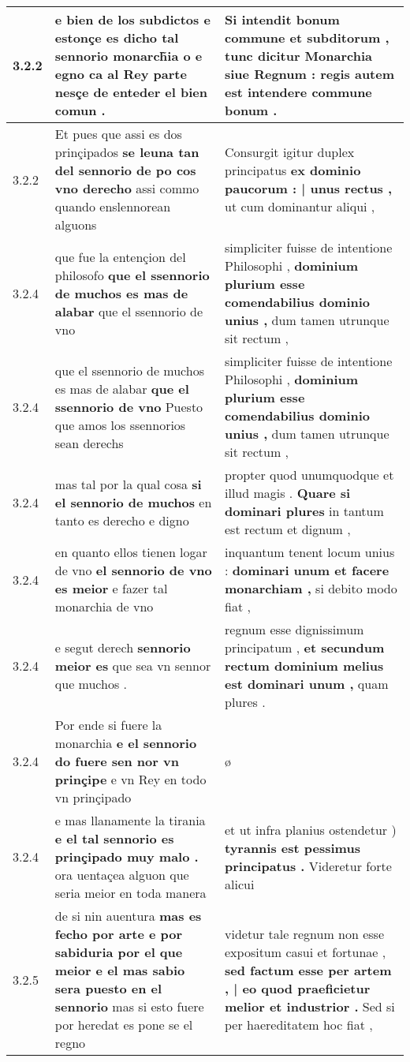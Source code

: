 \begin{tabular}{|p{1cm}|p{6.5cm}|p{6.5cm}|}
3.2.2 & e bien de los subdictos \textbf{ e estonçe es dicho tal sennorio monarch̃ia o e egno } ca al Rey parte nesçe de enteder el bien comun . & Si intendit bonum commune et subditorum , \textbf{ tunc dicitur Monarchia siue Regnum : } regis autem est intendere commune bonum . \\\hline
3.2.2 & Et pues que assi es dos prinçipados \textbf{ se leuna tan del sennorio de po cos vno derecho } assi commo quando enslennorean alguons & Consurgit igitur duplex principatus \textbf{ ex dominio paucorum : | unus rectus , } ut cum dominantur aliqui , \\\hline
3.2.4 & que fue la entençion del philosofo \textbf{ que el ssennorio de muchos es mas de alabar } que el ssennorio de vno & simpliciter fuisse de intentione Philosophi , \textbf{ dominium plurium esse comendabilius dominio unius , } dum tamen utrunque sit rectum , \\\hline
3.2.4 & que el ssennorio de muchos es mas de alabar \textbf{ que el ssennorio de vno } Puesto que amos los ssennorios sean derechs & simpliciter fuisse de intentione Philosophi , \textbf{ dominium plurium esse comendabilius dominio unius , } dum tamen utrunque sit rectum , \\\hline
3.2.4 & mas tal por la qual cosa \textbf{ si el sennorio de muchos } en tanto es derecho e digno & propter quod unumquodque et illud magis . \textbf{ Quare si dominari plures } in tantum est rectum et dignum , \\\hline
3.2.4 & en quanto ellos tienen logar de vno \textbf{ el sennorio de vno es meior } e fazer tal monarchia de vno & inquantum tenent locum unius : \textbf{ dominari unum et facere monarchiam , } si debito modo fiat , \\\hline
3.2.4 & e segut derech \textbf{ sennorio meior es } que sea vn sennor que muchos . & regnum esse dignissimum principatum , \textbf{ et secundum rectum dominium melius est dominari unum , } quam plures . \\\hline
3.2.4 & Por ende si fuere la monarchia \textbf{ e el sennorio do fuere sen nor vn prinçipe } e vn Rey en todo vn prinçipado & ø \\\hline
3.2.4 & e mas llanamente la tirania \textbf{ e el tal sennorio es prinçipado muy malo . } ora uentaçea alguon que seria meior en toda manera & et ut infra planius ostendetur ) \textbf{ tyrannis est pessimus principatus . } Videretur forte alicui \\\hline
3.2.5 & de si nin auentura \textbf{ mas es fecho por arte e por sabiduria por el que meior e el mas sabio sera puesto en el sennorio } mas si esto fuere por heredat es pone se el regno & videtur tale regnum non esse expositum casui et fortunae , \textbf{ sed factum esse per artem , | eo quod praeficietur melior et industrior . } Sed si per haereditatem hoc fiat , \\\hline

\end{tabular}
